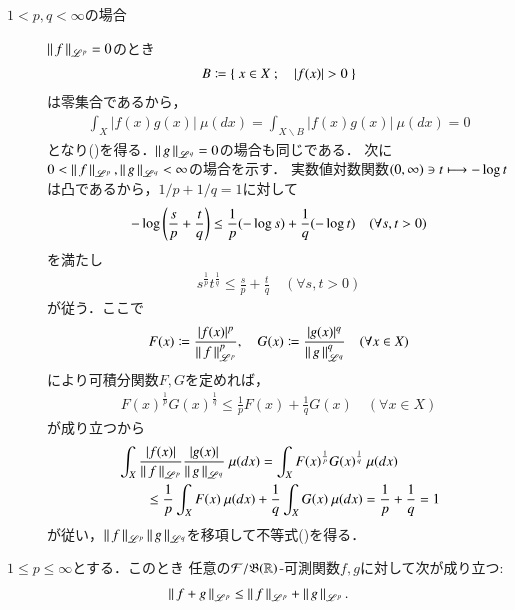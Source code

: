 \begin{prf}
\begin{description}
		\item[$1 < p,q < \infty$の場合]
			$\left\|\, f\, \right\|_{\mathscr{L}^p} = 0$のとき
			\begin{align}
				B \coloneqq \left\{\ x \in X\ ;\quad |f(x)| > 0\ \right\}
			\end{align}
			は零集合であるから，
			\begin{align}
				\int_{X} |f(x)g(x)|\ \mu(dx) = \int_{X \backslash B} |f(x)g(x)|\ \mu(dx) = 0
			\end{align}
			となり()を得る．$\left\|\, g\, \right\|_{\mathscr{L}^q} = 0$の場合も同じである．
			次に$0 < \left\|\, f\, \right\|_{\mathscr{L}^p},\left\|\, g\, \right\|_{\mathscr{L}^q} < \infty$の場合を示す．
			実数値対数関数$(0,\infty) \ni t \longmapsto -\operatorname{log} t$は凸であるから，$1/p + 1/q = 1$に対して
			\begin{align}
				-\operatorname{log} \left( \frac{s}{p} + \frac{t}{q} \right) \leq \frac{1}{p}(-\operatorname{log} s) + \frac{1}{q}(-\operatorname{log} t) \quad (\forall s,t > 0)
			\end{align}
			を満たし
			\begin{align}
				s^{\frac{1}{p}}t^{\frac{1}{q}} \leq \frac{s}{p} + \frac{t}{q} \quad (\forall s,t > 0)
			\end{align}
			が従う．ここで
			\begin{align}
				F(x) \coloneqq \frac{|f(x)|^p}{\left\|\, f\, \right\|_{\mathscr{L}^p}^p},
				\quad G(x) \coloneqq \frac{|g(x)|^q}{\left\|\, g\, \right\|_{\mathscr{L}^q}^q} \quad (\forall x \in X)
			\end{align}
			により可積分関数$F,G$を定めれば，
			\begin{align}
				F(x)^{\frac{1}{p}}G(x)^{\frac{1}{q}} \leq \frac{1}{p}F(x) + \frac{1}{q}G(x) \quad (\forall x \in X)
			\end{align}
			が成り立つから
			\begin{align}
				&\int_{X} \frac{|f(x)|}{\left\|\, f\, \right\|_{\mathscr{L}^p}} \frac{|g(x)|}{\left\|\, g\, \right\|_{\mathscr{L}^q}}\ \mu(dx)
				= \int_{X} F(x)^{\frac{1}{p}}G(x)^{\frac{1}{q}}\ \mu(dx) \\
				&\qquad \leq \frac{1}{p} \int_{X} F(x)\ \mu(dx) + \frac{1}{q} \int_{X} G(x)\ \mu(dx)
				= \frac{1}{p} + \frac{1}{q} = 1
			\end{align}
			が従い，$\left\|\, f\, \right\|_{\mathscr{L}^p}\left\|\, g\, \right\|_{\mathscr{L}^q}$を移項して不等式()を得る．
			\QED
	\end{description}
\end{prf}

\begin{screen}
	\begin{thm}[Minkowskiの不等式]
		$1 \leq p \leq \infty$とする．このとき
		任意の$\mathcal{F}/\mathfrak{B}(\mathbb{R})$-可測関数$f,g$に対して次が成り立つ:
		\begin{align}
			\left\|\, f+g\, \right\|_{\mathscr{L}^p} \leq \left\|\, f\, \right\|_{\mathscr{L}^p} + \left\|\, g\, \right\|_{\mathscr{L}^p}. \label{ineq:minkowski}
		\end{align}
	\end{thm}
\end{screen}


